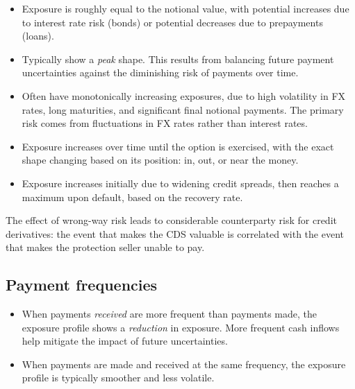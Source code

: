 \begin{itemize}
\item {} Exposure is roughly equal to the notional value,
with potential increases due to interest rate risk (bonds) or potential decreases
due to prepayments (loans).
\item {} Typically show a \emph{peak} shape. This results from
balancing future payment uncertainties against the diminishing risk of payments
over time.
\item {} Often have monotonically increasing
exposures, due to high volatility in FX rates, long maturities, and significant
final notional payments. The primary risk comes from fluctuations in FX rates
rather than interest rates.
\item {} Exposure increases over time until the option is
exercised, with the exact shape changing based on its position: in, out, or near
the money.
\item {} Exposure increases initially due to widening
credit spreads, then reaches a maximum upon default, based on the recovery rate.
\end{itemize}

\begin{crtrapbox}
The effect of wrong-way risk leads to considerable counterparty risk for credit
derivatives: the event that makes the CDS valuable is correlated with the event
that makes the protection seller unable to pay.
\end{crtrapbox}


\subsection*{Payment frequencies}

\begin{itemize}
\item {} When payments \emph{received} are more frequent
than payments made, the exposure profile shows a \emph{reduction} in exposure.
More frequent cash inflows help mitigate the impact of future uncertainties.
\item {} When payments are made and received at the same
frequency, the exposure profile is typically smoother and less volatile.
\end{itemize}

